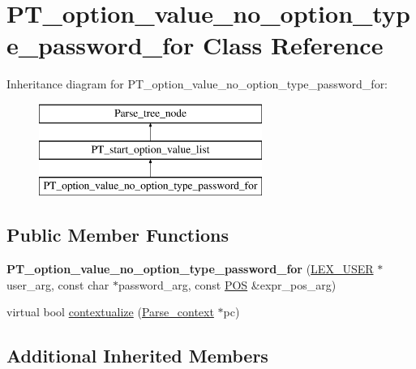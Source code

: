 \hypertarget{classPT__option__value__no__option__type__password__for}{}\section{P\+T\+\_\+option\+\_\+value\+\_\+no\+\_\+option\+\_\+type\+\_\+password\+\_\+for Class Reference}
\label{classPT__option__value__no__option__type__password__for}
Inheritance diagram for P\+T\+\_\+option\+\_\+value\+\_\+no\+\_\+option\+\_\+type\+\_\+password\+\_\+for\+:\begin{figure}[H]
\begin{center}
\leavevmode
\includegraphics[height=3.000000cm]{classPT__option__value__no__option__type__password__for}
\end{center}
\end{figure}
\subsection*{Public Member Functions}
\begin{DoxyCompactItemize}
\item 
\mbox{\label{classPT__option__value__no__option__type__password__for_a3ea581d4c92eaf6cd2205b938ac6f741}} 
{\bfseries P\+T\+\_\+option\+\_\+value\+\_\+no\+\_\+option\+\_\+type\+\_\+password\+\_\+for} (\mbox{\hyperlink{structst__lex__user}{L\+E\+X\+\_\+\+U\+S\+ER}} $\ast$user\+\_\+arg, const char $\ast$password\+\_\+arg, const \mbox{\hyperlink{structYYLTYPE}{P\+OS}} \&expr\+\_\+pos\+\_\+arg)
\item 
virtual bool \mbox{\hyperlink{classPT__option__value__no__option__type__password__for_adcaa99ced0dfdcc5f0b706499a9c6ad1}{contextualize}} (\mbox{\hyperlink{structParse__context}{Parse\+\_\+context}} $\ast$pc)
\end{DoxyCompactItemize}
\subsection*{Additional Inherited Members}


